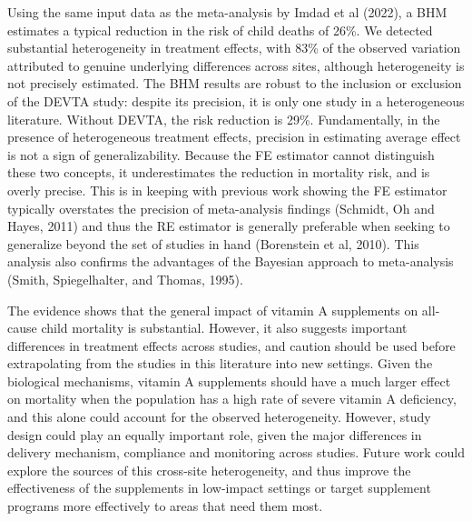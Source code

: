 \documentclass[12pt]{article}
\begin{document}
Using the same input data as the meta-analysis by Imdad et al (2022), a BHM estimates a typical reduction in the risk of child deaths of 26\%. 
We detected substantial heterogeneity in treatment effects, with 83\% of the observed variation attributed to genuine underlying differences across sites, although heterogeneity is not precisely estimated. The BHM results are robust to the inclusion or exclusion of the DEVTA study: despite its precision, it is only one study in a heterogeneous literature. Without DEVTA, the risk reduction is 29\%. 
Fundamentally, in the presence of heterogeneous treatment effects, precision in estimating average effect is not a sign of generalizability. 
Because the FE estimator cannot distinguish these two concepts, it underestimates the reduction in mortality risk, and is overly precise. 
This is in keeping with previous work showing the FE estimator typically overstates the precision of meta-analysis findings (Schmidt, Oh and Hayes, 2011) and thus the RE estimator is generally preferable when seeking to generalize beyond the set of studies in hand (Borenstein et al, 2010). 
This analysis also confirms the advantages of the Bayesian approach to meta-analysis (Smith, Spiegelhalter, and Thomas, 1995).

The evidence shows that the general impact of vitamin A supplements on all-cause child mortality is substantial. However, it also suggests important differences in treatment effects across studies, and caution should be used before extrapolating from the studies in this literature into new settings. Given the biological mechanisms, vitamin A supplements should have a much larger effect on mortality when the population has a high rate of severe vitamin A deficiency, and this alone could account for the observed heterogeneity. However, study design could play an equally important role, given the major differences in delivery mechanism, compliance and monitoring across studies. Future work could explore the sources of this cross-site heterogeneity, and thus improve the effectiveness of the supplements in low-impact settings or target supplement programs more effectively to areas that need them most.

\clearpage
\end{document}
